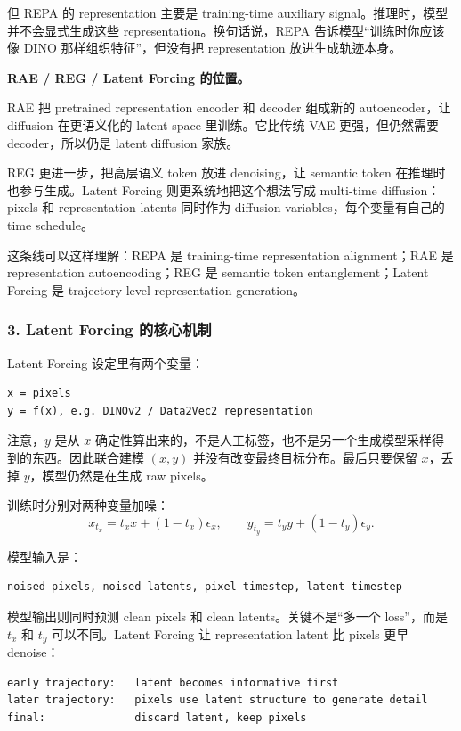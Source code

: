 但 REPA 的 representation 主要是 training-time auxiliary signal。推理时，模型并不会显式生成这些 representation。换句话说，REPA 告诉模型“训练时你应该像 DINO 那样组织特征”，但没有把 representation 放进生成轨迹本身。

\textbf{RAE / REG / Latent Forcing 的位置。}

RAE 把 pretrained representation encoder 和 decoder 组成新的 autoencoder，让 diffusion 在更语义化的 latent space 里训练。它比传统 VAE 更强，但仍然需要 decoder，所以仍是 latent diffusion 家族。

REG 更进一步，把高层语义 token 放进 denoising，让 semantic token 在推理时也参与生成。Latent Forcing 则更系统地把这个想法写成 multi-time diffusion：pixels 和 representation latents 同时作为 diffusion variables，每个变量有自己的 time schedule。

\begin{intubox}
这条线可以这样理解：REPA 是 training-time representation alignment；RAE 是 representation autoencoding；REG 是 semantic token entanglement；Latent Forcing 是 trajectory-level representation generation。
\end{intubox}

\subsubsection*{3. Latent Forcing 的核心机制}

Latent Forcing 设定里有两个变量：
\begin{lstlisting}[language={},basicstyle=\ttfamily\small]
x = pixels
y = f(x), e.g. DINOv2 / Data2Vec2 representation
\end{lstlisting}

注意，$y$ 是从 $x$ 确定性算出来的，不是人工标签，也不是另一个生成模型采样得到的东西。因此联合建模 $(x,y)$ 并没有改变最终目标分布。最后只要保留 $x$，丢掉 $y$，模型仍然是在生成 raw pixels。

训练时分别对两种变量加噪：
\[
x_{t_x} = t_x x + (1-t_x)\epsilon_x,
\qquad
y_{t_y} = t_y y + (1-t_y)\epsilon_y .
\]

模型输入是：
\begin{lstlisting}[language={},basicstyle=\ttfamily\small]
noised pixels, noised latents, pixel timestep, latent timestep
\end{lstlisting}

模型输出则同时预测 clean pixels 和 clean latents。关键不是“多一个 loss”，而是 $t_x$ 和 $t_y$ 可以不同。Latent Forcing 让 representation latent 比 pixels 更早 denoise：
\begin{lstlisting}[language={},basicstyle=\ttfamily\small]
early trajectory:   latent becomes informative first
later trajectory:   pixels use latent structure to generate detail
final:              discard latent, keep pixels
\end{lstlisting}

